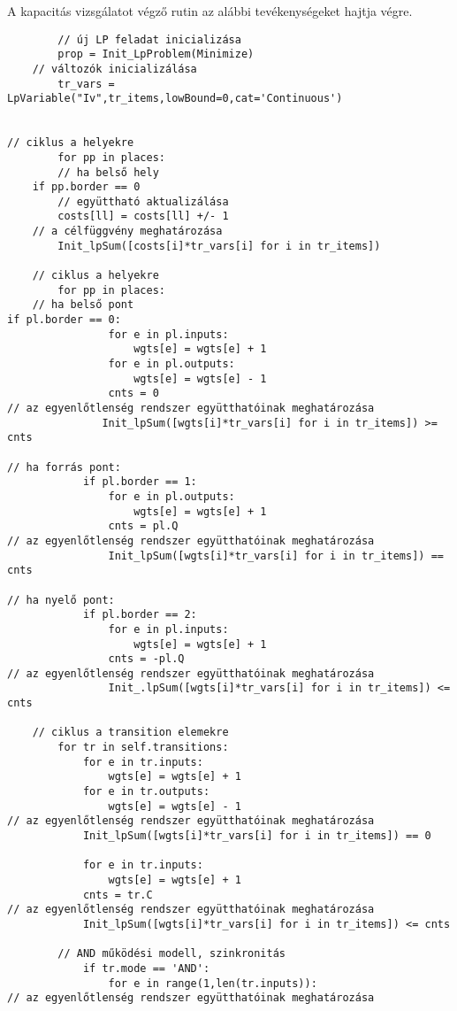 A kapacitás vizsgálatot végző rutin az alábbi tevékenységeket hajtja végre.
\begin{verbatim}
     	// új LP feladat inicializása
        prop = Init_LpProblem(Minimize)
	// változók inicializálása
        tr_vars = LpVariable("Iv",tr_items,lowBound=0,cat='Continuous')


// ciklus a helyekre
        for pp in places:
		// ha belső hely
	if pp.border == 0
		// együttható aktualizálása
		costs[ll] = costs[ll] +/- 1
	// a célfüggvény meghatározása
        Init_lpSum([costs[i]*tr_vars[i] for i in tr_items])

	// ciklus a helyekre
        for pp in places:
	// ha belső pont
if pl.border == 0:
                for e in pl.inputs:
                    wgts[e] = wgts[e] + 1
                for e in pl.outputs:
                    wgts[e] = wgts[e] - 1
                cnts = 0
// az egyenlőtlenség rendszer együtthatóinak meghatározása 
               Init_lpSum([wgts[i]*tr_vars[i] for i in tr_items]) >= cnts
		
// ha forrás pont:
            if pl.border == 1:
                for e in pl.outputs:
                    wgts[e] = wgts[e] + 1
                cnts = pl.Q
// az egyenlőtlenség rendszer együtthatóinak meghatározása 
                Init_lpSum([wgts[i]*tr_vars[i] for i in tr_items]) == cnts

// ha nyelő pont:
            if pl.border == 2:
                for e in pl.inputs:
                    wgts[e] = wgts[e] + 1
                cnts = -pl.Q
// az egyenlőtlenség rendszer együtthatóinak meghatározása 
                Init_.lpSum([wgts[i]*tr_vars[i] for i in tr_items]) <= cnts

	// ciklus a transition elemekre
        for tr in self.transitions:
            for e in tr.inputs:
                wgts[e] = wgts[e] + 1
            for e in tr.outputs:
                wgts[e] = wgts[e] - 1
// az egyenlőtlenség rendszer együtthatóinak meghatározása 
            Init_lpSum([wgts[i]*tr_vars[i] for i in tr_items]) == 0

            for e in tr.inputs:
                wgts[e] = wgts[e] + 1
            cnts = tr.C
// az egyenlőtlenség rendszer együtthatóinak meghatározása 
            Init_lpSum([wgts[i]*tr_vars[i] for i in tr_items]) <= cnts

		// AND működési modell, szinkronitás
            if tr.mode == 'AND':
                for e in range(1,len(tr.inputs)):
// az egyenlőtlenség rendszer együtthatóinak meghatározása 


\end{verbatim}
